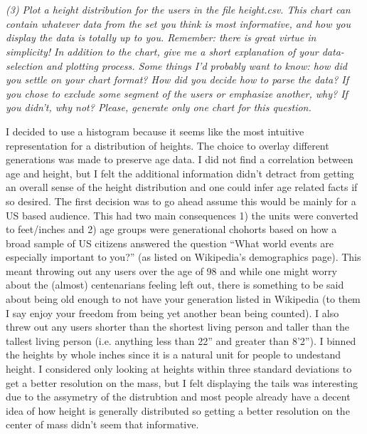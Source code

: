 \documentclass[a4paper,12pt]{article}
\begin{document}
\section{}
\emph{(3) Plot a height distribution for the users in the file height.csv. This chart can contain whatever data
from the set you think is most informative, and how you display the data is totally up to you.
Remember: there is great virtue in simplicity! In addition to the chart, give me a short explanation of
your data-selection and plotting process. Some things I’d probably want to know: how did you settle on
your chart format? How did you decide how to parse the data? If you chose to exclude some segment of
the users or emphasize another, why? If you didn’t, why not? Please, generate only one chart for this
question.}

I decided to use a histogram because it seems like the most intuitive representation for a distribution of heights.  The choice to overlay different generations was made to preserve age data.  I did not find a correlation between age and height, but I felt the additional information didn't detract from getting an overall sense of the height distribution and one could infer age related facts if so desired.  The first decision was to go ahead assume this would be mainly for a US based audience.  This had two main consequences  1) the units were converted to feet/inches and 2)  age groups were generational chohorts based on how a broad sample of US citizens answered the question ``What world events are especially important to you?'' (as listed on Wikipedia's demographics page).  This meant throwing out any users over the age of 98 and while one might worry about the (almost) centenarians feeling left out, there is something to be said about being old enough to not have your generation listed in Wikipedia (to them I say enjoy your freedom from being yet another bean being counted).  I also threw out any users shorter than the shortest living person and taller than the tallest living person (i.e. anything less than 22'' and greater than 8'2'').  I binned the heights by whole inches since it is a natural unit for people to undestand height.  I considered only looking at heights within three standard deviations to get a better resolution on the mass, but I felt displaying the tails was interesting due to the assymetry of the distrubtion and most people already have a decent idea of how height is generally distributed so getting a better resolution on the center of mass didn't seem that informative.
\end{document}

